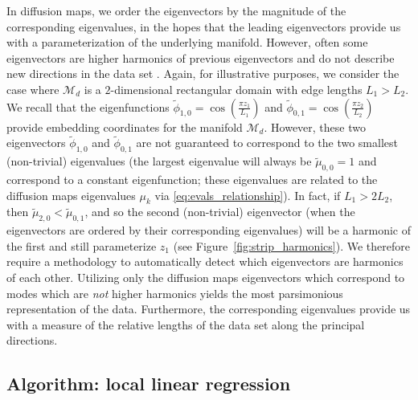 \documentclass[preprint]{elsarticle}
\begin{document}
In diffusion maps, we order the eigenvectors by the magnitude of the corresponding eigenvalues, in the hopes that the leading eigenvectors provide us with a parameterization of the underlying manifold.
%
However, often some eigenvectors are higher harmonics of previous eigenvectors and do not describe new directions in the data set \cite{gerber2007robust}.
%
Again, for illustrative purposes, we consider the case where $\mathcal{M}_d$ is a $2$-dimensional rectangular domain with edge lengths $L_1  > L_2$. 
%
We recall that the eigenfunctions $\tilde{\phi}_{1,0} = \cos \left( \frac {\pi z_1}{L_1} \right)$ and  $\tilde{\phi}_{0,1} = \cos \left( \frac {\pi z_2}{L_2} \right)$ provide embedding coordinates for the manifold $\mathcal{M}_d$. 
%
However, these two eigenvectors $\tilde{\phi}_{1, 0}$ and $\tilde{\phi}_{0, 1}$ are not guaranteed to correspond to the two smallest (non-trivial) eigenvalues (the largest eigenvalue will always be $\tilde{\mu}_{0,0} = 1$ and correspond to a constant eigenfunction; these eigenvalues are related to the diffusion maps eigenvalues $\mu_k$ via \eqref{eq:evals_relationship}). 
%
In fact, if $L_1 > 2 L_2$, then $\tilde{\mu}_{2, 0} < \tilde{\mu}_{0, 1}$, and so the second (non-trivial) eigenvector (when the eigenvectors are ordered by their corresponding eigenvalues) will be a harmonic of the first and still parameterize $z_1$ (see Figure~\ref{fig:strip_harmonics}).
%
We therefore require a methodology to automatically detect which eigenvectors are harmonics of each other. 
%
Utilizing only the diffusion maps eigenvectors which correspond to modes which are {\em not} higher harmonics yields the most parsimonious representation of the data.
%
Furthermore, the corresponding eigenvalues provide us with a measure of the relative lengths of the data set along the principal directions. 


\subsection{Algorithm: local linear regression}
\end{document}
